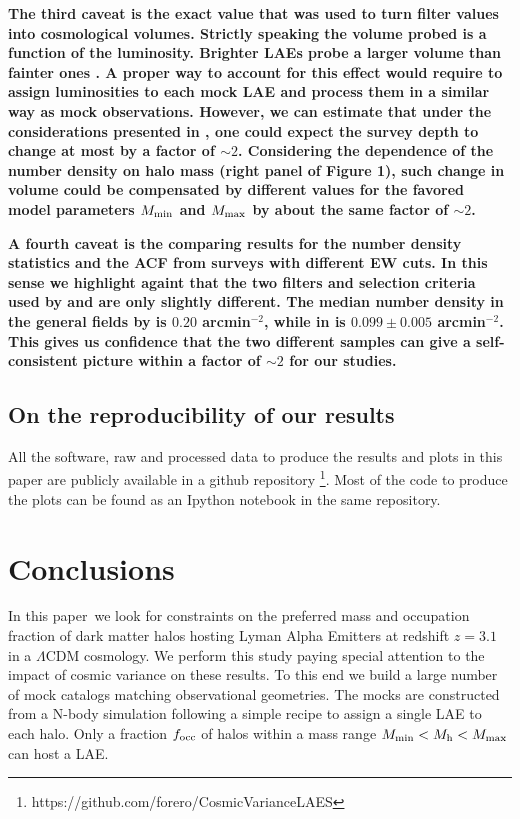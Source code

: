 \documentclass[usenatbib]{mn2e}
\newcommand{\documentname}{paper~}
\newcommand{\ly}{{\ifmmode{{\rm Ly}\alpha}\else{Ly$\alpha$~}\fi}}
\begin{document}
{\bf The third caveat is the exact value that was used to turn
  filter values into cosmological volumes. Strictly speaking the
  volume probed is a function of the \ly luminosity. Brighter LAEs
  probe a larger volume than fainter ones \citep{Gronwall07}. A proper
way to account for this effect would require to assign luminosities to
each mock LAE and process them in a similar way as mock
observations. However, we can estimate that under the considerations
presented in \citep{Gronwall07}, one could expect the survey depth to
change at most by a factor of $\sim2$. Considering the dependence
of the number density on halo mass (right panel of Figure 1), such
change in volume could be compensated by different values for the
favored model parameters $M_{\rm  min}$ and $M_{\rm max}$ by about the
same factor of $\sim2$. }

{\bf A fourth caveat is the comparing results for the number density
  statistics and the ACF from surveys with different EW cuts. In this
  sense we highlight againt that the two filters and selection
  criteria used by \citep{Ouchi2008} and \citep{Yamada2012} are only
  slightly different. The median number density in the general fields by
  \citep{Yamada2012} is $0.20$ arcmin$^{-2}$, while in
  \citep{Ouchi2008} is $0.099\pm0.005$ arcmin$^{-2}$. This gives us
  confidence that the two different samples can give a self-consistent picture
  within a factor of $\sim2$ for our studies.}  



\subsection{On the reproducibility of our results}

All the software, raw and processed data to produce the results
and plots in this paper are publicly available in a github
repository \footnote{https://github.com/forero/CosmicVarianceLAES}. Most
of the code to produce the plots can be found as an Ipython notebook
\citep{IPython} in the same repository.



\section{Conclusions}
\label{sec:conclusions}

In this \documentname we look for constraints on the preferred mass
and occupation fraction of dark matter halos hosting Lyman Alpha Emitters at
redshift $z=3.1$ in a $\Lambda$CDM cosmology. We perform this study
paying special attention to the impact of cosmic variance on these
results. To this end we build a large number of mock catalogs matching
observational geometries. The mocks are constructed from a N-body simulation
following a simple recipe to assign a single LAE to each halo. Only
a fraction $f_{\rm occ}$ of halos within a mass range  $M_{\rm
  min}<M_{\rm h}<M_{\rm   max}$ can host a LAE. 
\end{document}
